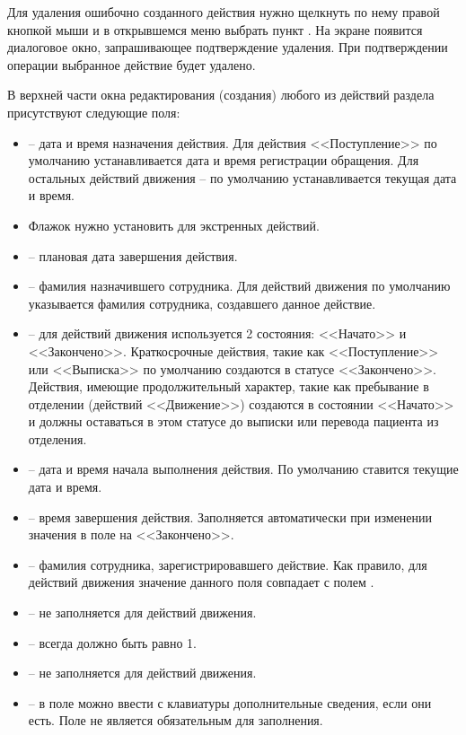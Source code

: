 Для удаления ошибочно созданного действия нужно щелкнуть по нему правой кнопкой мыши и в открывшемся меню выбрать пункт . На экране появится диалоговое окно, запрашивающее подтверждение удаления. При подтверждении операции выбранное действие будет удалено.

В верхней части окна редактирования (создания) любого из действий раздела  присутствуют следующие поля:
\begin{itemize}
 \item {} – дата и время назначения действия. Для действия <<Поступление>> по умолчанию устанавливается дата и время регистрации обращения. Для остальных действий движения – по умолчанию устанавливается текущая дата и время.
 \item Флажок  нужно установить для экстренных действий.
 \item {} – плановая дата завершения действия.
 \item {} – фамилия назначившего сотрудника. Для действий движения по умолчанию указывается фамилия сотрудника, создавшего данное действие.
 \item {} – для действий движения используется 2 состояния: <<Начато>> и <<Закончено>>. Краткосрочные действия, такие как <<Поступление>> или <<Выписка>> по умолчанию создаются в статусе <<Закончено>>. Действия, имеющие продолжительный характер, такие как пребывание в отделении (действий <<Движение>>) создаются в состоянии <<Начато>> и должны оставаться в этом статусе до выписки или перевода пациента из отделения.
 \item {} – дата и время начала выполнения действия. По умолчанию ставится текущие дата и время.
 \item {} – время завершения действия. Заполняется автоматически при изменении значения в поле  на <<Закончено>>. 
 \item {} – фамилия сотрудника, зарегистрировавшего действие. Как правило, для действий движения значение данного поля совпадает с полем .
 \item {} – не заполняется для действий движения.
 \item {} – всегда должно быть равно 1.
 \item {} – не заполняется для действий движения.
 \item {} – в поле можно ввести с клавиатуры дополнительные сведения, если они есть. Поле не является обязательным для заполнения.
\end{itemize}
 
